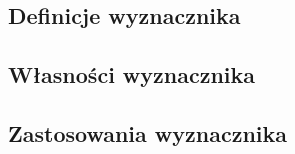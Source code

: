 \subsection{Definicje wyznacznika}


\subsection{Własności wyznacznika}


\subsection{Zastosowania wyznacznika}


\newpage 